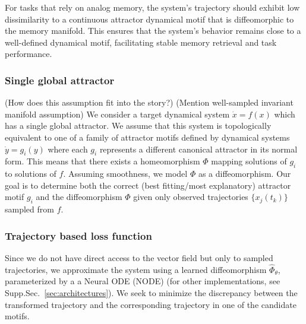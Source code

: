 \documentclass{article}
\newcommand{\ascomment}[1]{\textcolor{ascolor}{(#1)}}
\theoremstyle{definition} \newtheorem{definition}{Definition}  \newtheorem{example}{Example}
\theoremstyle{remark} \newtheorem{remark}{Remark}
\newcounter{ct}
\begin{document}
For tasks that rely on analog memory, the system's trajectory should exhibit low dissimilarity to a  continuous attractor dynamical motif that is diffeomorphic to the memory manifold\citep{beer2018laformation,ribeiro2020beyond}.
This ensures that the system's behavior remains close to a well-defined dynamical motif, facilitating stable memory retrieval and task performance.


\subsubsection{Single global attractor}
\ascomment{How does this assumption fit into the story?}
\ascomment{Mention well-sampled invariant manifold assumption}
We consider a target dynamical system $\dot{x} = f(x)$ which has a single global attractor.
 We assume that this system is topologically equivalent to one of a family of attractor motifs defined by dynamical systems $\dot{y} = g_i(y)$ where each $g_i$ represents a different canonical attractor in its normal form.
This means that there exists a homeomorphism $\Phi$ mapping solutions of $g_i$ to solutions of $f$.
Assuming smoothness, we model $\Phi$ as a diffeomorphism.
Our goal is to determine both the correct (best fitting/most explanatory) attractor motif $g_i$ and the diffeomorphism $\Phi$ given only observed trajectories $\{x_j(t_k)\}$ sampled from $f$.


\subsubsection{Trajectory based loss function}\label{sec:loss} %
Since we do not have direct access to the vector field but only to sampled trajectories, we approximate the system using a learned diffeomorphism \( \hat{\Phi}_\theta \), parameterized by a a Neural ODE (NODE) \citep{chen2018neural} (for other implementations, see Supp.Sec.~\ref{sec:architectures}).
 We seek to minimize the discrepancy between the transformed trajectory and the corresponding trajectory in one of the candidate motifs.
\end{document}
